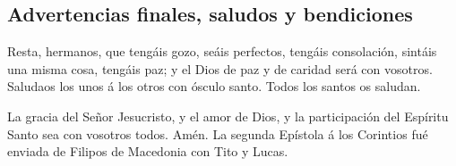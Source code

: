 \hypertarget{advertencias-finales-saludos-y-bendiciones}{%
\subsection{Advertencias finales, saludos y
bendiciones}\label{advertencias-finales-saludos-y-bendiciones}}

 Resta, hermanos, que tengáis gozo, seáis perfectos,
tengáis consolación, sintáis una misma cosa, tengáis paz; y el Dios de
paz y de caridad será con vosotros.  Saludaos los unos á
los otros con ósculo santo. Todos los santos os saludan.

 La gracia del Señor Jesucristo, y el amor de Dios, y la
participación del Espíritu Santo sea con vosotros todos. Amén. La
segunda Epístola á los Corintios fué enviada de Filipos de Macedonia con
Tito y Lucas.
